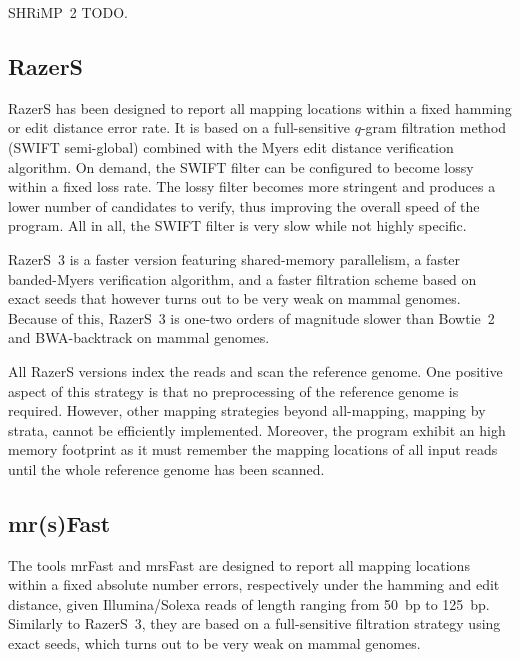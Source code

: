SHRiMP~2 TODO.


\subsection{RazerS}

RazerS \citep{Weese2009} has been designed to report all mapping locations within a fixed hamming or edit distance error rate.
It is based on a full-sensitive $q$-gram filtration method (SWIFT semi-global) combined with the Myers edit distance verification algorithm.
On demand, the SWIFT filter can be configured to become lossy within a fixed loss rate.
The lossy filter becomes more stringent and produces a lower number of candidates to verify, thus improving the overall speed of the program.
All in all, the SWIFT filter is very slow while not highly specific.

RazerS~3 \citep{RazerS3} is a faster version featuring shared-memory parallelism, a faster banded-Myers verification algorithm, and a faster filtration scheme based on exact seeds that however turns out to be very weak on mammal genomes.
Because of this, RazerS~3 is one-two orders of magnitude slower than Bowtie~2 and BWA-backtrack on mammal genomes.

All RazerS versions index the reads and scan the reference genome.
One positive aspect of this strategy is that no preprocessing of the reference genome is required.
However, other mapping strategies beyond all-mapping, \eg mapping by strata, cannot be efficiently implemented.
Moreover, the program exhibit an high memory footprint as it must remember the mapping locations of all input reads until the whole reference genome has been scanned.


\subsection{mr(s)Fast}

The tools mrFast \citep{Ahmadi2011} and mrsFast \citep{Hach2010} are designed to report all mapping locations within a fixed absolute number errors, respectively under the hamming and edit distance, given Illumina/Solexa reads of length ranging from 50~bp to 125~bp.
Similarly to RazerS~3, they are based on a full-sensitive filtration strategy using exact seeds, which turns out to be very weak on mammal genomes.

